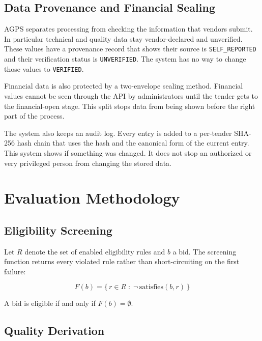 \documentclass[conference]{IEEEtran}
\begin{document}
\subsection{Data Provenance and Financial Sealing}
\label{subsec:provenance}

AGPS separates processing from checking the information that vendors
submit. In particular technical and quality data stay vendor-declared and
unverified. These values have a provenance record that shows their source
is \texttt{SELF\_REPORTED} and their verification status is
\texttt{UNVERIFIED}. The system has no way to change those values to
\texttt{VERIFIED}.

Financial data is also protected by a two-envelope sealing method.
Financial values cannot be seen through the API by administrators until
the tender gets to the financial-open stage. This split stops data from
being shown before the right part of the process.

The system also keeps an audit log. Every entry is added to a per-tender
SHA-256 hash chain that uses the hash and the canonical form of the
current entry. This system shows if something was changed. It does not
stop an authorized or very privileged person from changing the stored
data.

\section{Evaluation Methodology}
\label{sec:method}

\subsection{Eligibility Screening}

Let $R$ denote the set of enabled eligibility rules and $b$ a bid. The
screening function returns every violated rule rather than
short-circuiting on the first failure:

\begin{equation}
F(b) = \{\, r \in R \;:\; \neg\,\mathrm{satisfies}(b, r) \,\}
\label{eq:eligibility}
\end{equation}

A bid is eligible if and only if $F(b) = \emptyset$.

\subsection{Quality Derivation}
\end{document}
